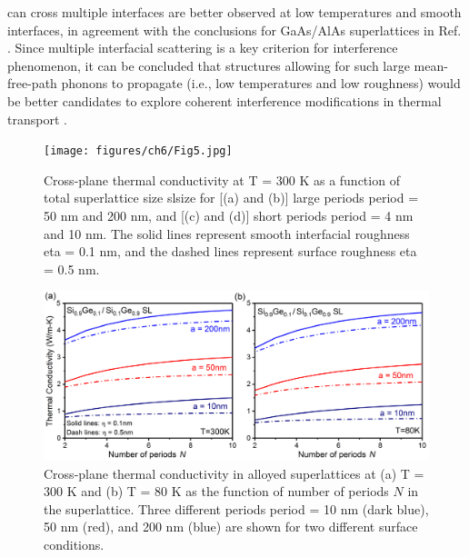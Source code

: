 can cross multiple interfaces are better observed at low temperatures and smooth interfaces, in agreement with the conclusions for GaAs/AlAs superlattices in Ref. \cite{RN394}. Since multiple interfacial scattering is a key criterion for interference phenomenon, it can be concluded that structures allowing for such large mean-free-path phonons to propagate (i.e., low temperatures and low roughness) would be better candidates to explore coherent interference modifications in thermal transport \cite{RN362,RN394,RN393}.
\begin{figure}[hbtp]
  \centering \texttt{[image: figures/ch6/Fig5.jpg]}
  \caption{Cross-plane thermal conductivity at \gls{T} = 300 K as a function of total superlattice size \gls{slsize} for [(a) and (b)] large periods \gls{period} = 50 nm and 200 nm, and [(c) and (d)] short periods \gls{period} = 4 nm and 10 nm. The solid lines represent smooth interfacial roughness \gls{eta} = 0.1 nm, and the dashed lines represent surface roughness \gls{eta} = 0.5 nm.}
  \label{fig:ch6-5}
\end{figure}
\begin{figure}[hbt]
  \centering \includegraphics[width=1.0\textwidth]{figures/ch6/Fig6.jpg}
  \caption{Cross-plane thermal conductivity in alloyed superlattices at (a) \gls{T} = 300 K and (b) \gls{T} = 80 K as the function of number of periods $N$ in the superlattice. Three different periods \gls{period} = 10 nm (dark blue), 50 nm (red), and 200 nm (blue) are shown for two different surface conditions.}
  \label{fig:ch6-6}
\end{figure}
